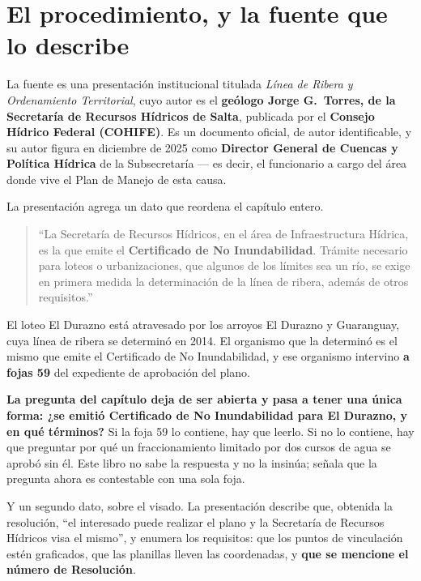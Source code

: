 \section{El procedimiento, y la fuente que lo describe}

La fuente es una presentación institucional titulada \textit{Línea de Ribera y Ordenamiento Territorial}, cuyo autor es el \textbf{geólogo Jorge G.\ Torres, de la Secretaría de Recursos Hídricos de Salta}, publicada por el \textbf{Consejo Hídrico Federal (COHIFE)}. Es un documento oficial, de autor identificable, y su autor figura en diciembre de 2025 como \textbf{Director General de Cuencas y Política Hídrica} de la Subsecretaría --- es decir, el funcionario a cargo del área donde vive el Plan de Manejo de esta causa.

\begin{cautela}
La presentación agrega un dato que reordena el capítulo entero.

\begin{quote}
``La Secretaría de Recursos Hídricos, en el área de Infraestructura Hídrica, es la que emite el \textbf{Certificado de No Inundabilidad}. Trámite necesario para loteos o urbanizaciones, que algunos de los límites sea un río, se exige en primera medida la determinación de la línea de ribera, además de otros requisitos.''
\end{quote}

El loteo El Durazno está atravesado por los arroyos El Durazno y Guaranguay, cuya línea de ribera se determinó en 2014. El organismo que la determinó es el mismo que emite el Certificado de No Inundabilidad, y ese organismo intervino \textbf{a fojas 59} del expediente de aprobación del plano.

\textbf{La pregunta del capítulo deja de ser abierta y pasa a tener una única forma: ¿se emitió Certificado de No Inundabilidad para El Durazno, y en qué términos?} Si la foja 59 lo contiene, hay que leerlo. Si no lo contiene, hay que preguntar por qué un fraccionamiento limitado por dos cursos de agua se aprobó sin él. Este libro no sabe la respuesta y no la insinúa; señala que la pregunta ahora es contestable con una sola foja.
\end{cautela}

Y un segundo dato, sobre el visado. La presentación describe que, obtenida la resolución, ``el interesado puede realizar el plano y la Secretaría de Recursos Hídricos visa el mismo'', y enumera los requisitos: que los puntos de vinculación estén graficados, que las planillas lleven las coordenadas, y \textbf{que se mencione el número de Resolución}.

